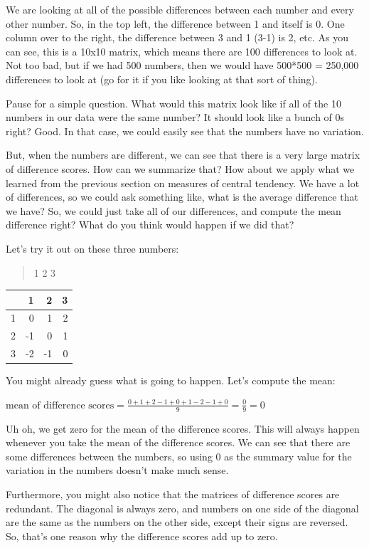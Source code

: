 \documentclass[
]{book}
\begin{document}
We are looking at all of the possible differences between each number and every other number. So, in the top left, the difference between 1 and itself is 0. One column over to the right, the difference between 3 and 1 (3-1) is 2, etc. As you can see, this is a 10x10 matrix, which means there are 100 differences to look at. Not too bad, but if we had 500 numbers, then we would have 500*500 = 250,000 differences to look at (go for it if you like looking at that sort of thing).

Pause for a simple question. What would this matrix look like if all of the 10 numbers in our data were the same number? It should look like a bunch of 0s right? Good. In that case, we could easily see that the numbers have no variation.

But, when the numbers are different, we can see that there is a very large matrix of difference scores. How can we summarize that? How about we apply what we learned from the previous section on measures of central tendency. We have a lot of differences, so we could ask something like, what is the average difference that we have? So, we could just take all of our differences, and compute the mean difference right? What do you think would happen if we did that?

Let's try it out on these three numbers:

\begin{quote}
1 2 3
\end{quote}

\begin{tabular}{l|r|r|r}
\hline
  & 1 & 2 & 3\\
\hline
1 & 0 & 1 & 2\\
\hline
2 & -1 & 0 & 1\\
\hline
3 & -2 & -1 & 0\\
\hline
\end{tabular}

You might already guess what is going to happen. Let's compute the mean:

\(\text{mean of difference scores} = \frac{0+1+2-1+0+1-2-1+0}{9} = \frac{0}{9} = 0\)

Uh oh, we get zero for the mean of the difference scores. This will always happen whenever you take the mean of the difference scores. We can see that there are some differences between the numbers, so using 0 as the summary value for the variation in the numbers doesn't make much sense.

Furthermore, you might also notice that the matrices of difference scores are redundant. The diagonal is always zero, and numbers on one side of the diagonal are the same as the numbers on the other side, except their signs are reversed. So, that's one reason why the difference scores add up to zero.
\end{document}
